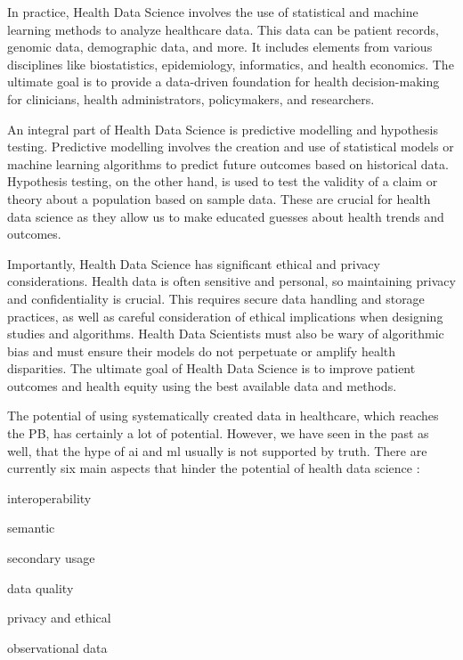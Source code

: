 In practice, Health Data Science involves the use of statistical and machine learning methods to analyze healthcare data. This data can be patient records, genomic data, demographic data, and more. It includes elements from various disciplines like biostatistics, epidemiology, informatics, and health economics. The ultimate goal is to provide a data-driven foundation for health decision-making for clinicians, health administrators, policymakers, and researchers.

An integral part of Health Data Science is predictive modelling and hypothesis testing. Predictive modelling involves the creation and use of statistical models or machine learning algorithms to predict future outcomes based on historical data. Hypothesis testing, on the other hand, is used to test the validity of a claim or theory about a population based on sample data. These are crucial for health data science as they allow us to make educated guesses about health trends and outcomes.

Importantly, Health Data Science has significant ethical and privacy considerations. Health data is often sensitive and personal, so maintaining privacy and confidentiality is crucial. This requires secure data handling and storage practices, as well as careful consideration of ethical implications when designing studies and algorithms. Health Data Scientists must also be wary of algorithmic bias and must ensure their models do not perpetuate or amplify health disparities. The ultimate goal of Health Data Science is to improve patient outcomes and health equity using the best available data and methods.


The potential of using systematically created data in healthcare, which reaches the PB, has certainly a lot of potential. However, we have seen in the past as well, that the hype of \ac{ai} and \ac{ml} usually is not supported by truth. There are currently six main aspects that hinder the potential of health data science \cite{panchInconvenientTruthAI2019,peekThreeControversiesHealth2018}:
\begin{myitemize}
    \item interoperability
    \item semantic
    \item secondary usage
    \item data quality
    \item privacy and ethical
    \item observational data
\end{myitemize}




